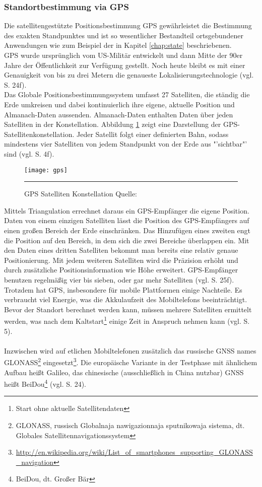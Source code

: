 \subsubsection{Standortbestimmung via \gls{GPS}}
Die satellitengestützte Positionsbestimmung \gls{GPS} gewährleistet die Bestimmung des exakten Standpunktes und ist so wesentlicher Bestandteil ortsgebundener Anwendungen wie zum Beispiel der in Kapitel \ref{chap:state} beschriebenen. \\
\gls{GPS} wurde ursprünglich vom US-Militär entwickelt und dann Mitte der 90er Jahre der Öffentlichkeit zur Verfügung gestellt. Noch heute bleibt es mit einer Genauigkeit von bis zu drei Metern die genaueste Lokalisierungstechnologie (vgl. \cite{gps} S. 24f).\\
Das Globale Positionsbestimmungssystem umfasst 27 Satelliten, die ständig die Erde umkreisen und dabei kontinuierlich ihre eigene, aktuelle Position und Almanach-Daten aussenden. Almanach-Daten enthalten Daten über jeden Satelliten in der Konstellation. Abbildung \ref{fig:gps} zeigt eine Darstellung der GPS-Satellitenkonstellation. Jeder Satellit folgt einer definierten Bahn, sodass mindestens vier Satelliten von jedem Standpunkt von der Erde aus "'sichtbar"' sind (vgl. \cite{location} S. 4f).\\
\begin{figure}[H]  
    \centering  
    \texttt{[image: gps]} 
    \rule{35em}{0.5pt}
    \caption[GPS Satelliten Konstellation]{GPS Satelliten Konstellation  Quelle: \cite{fig:gps}}
    \label{fig:gps}
\end{figure}
Mittels Triangulation errechnet daraus ein \gls{GPS}-Empfänger die eigene Position. Daten von einem einzigen Satelliten lässt die Position des \gls{GPS}-Empfängers auf einen großen Bereich der Erde einschränken. Das Hinzufügen eines zweiten engt die Position auf den Bereich, in dem sich die zwei Bereiche überlappen ein. Mit den Daten eines dritten Satelliten bekommt man bereits eine relativ genaue Positionierung. Mit jedem weiteren Satelliten wird die Präzision erhöht und durch zusätzliche Positionsinformation wie Höhe erweitert. \gls{GPS}-Empfänger benutzen regelmäßig vier bis sieben, oder gar mehr Satelliten (vgl. \cite{gps} S. 25f).\\
Trotzdem hat \gls{GPS}, insbesondere für mobile Plattformen einige Nachteile. Es verbraucht viel Energie, was die Akkulaufzeit des Mobiltelefons beeinträchtigt. Bevor der Standort berechnet werden kann, müssen mehrere Satelliten ermittelt werden, was nach dem Kaltstart\footnote{ Start ohne aktuelle Satellitendaten} einige Zeit in Anspruch nehmen kann (vgl. \cite{location} S. 5).\\\\
Inzwischen wird auf etlichen Mobiltelefonen zusätzlich das russische \gls{GNSS} names GLONASS\footnote{ GLONASS, russisch Globalnaja nawigazionnaja sputnikowaja sistema, dt. Globales Satellitennavigationssystem} eingesetzt\footnote{ \url{http://en.wikipedia.org/wiki/List_of_smartphones_supporting_GLONASS_navigation}}.
Die europäische Variante in der Testphase mit ähnlichem Aufbau heißt Galileo, das chinesische (ausschließlich in China nutzbar) \gls{GNSS} heißt BeiDou\footnote{ BeiDou, dt. Großer Bär} (vgl. \cite{gps} S. 24).

